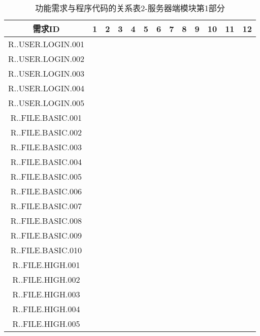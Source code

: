 \begin{table}[htbp]
\centering
\caption{功能需求与程序代码的关系表2-服务器端模块第1部分} \label{tab:requirement-module}
\begin{tabular}{|c|c|c|c|c|c|c|c|c|c|c|c|c|}
    \hline 
    需求ID & 1 & 2 & 3 & 4 & 5 & 6 & 7 & 8 & 9 & 10 & 11 & 12 \\    
    \hline 
    R..USER.LOGIN.001 &&&&&&&&&&&& \\
    \hline
    R..USER.LOGIN.002 &&&&&&&&&&&& \\
    \hline 
    R..USER.LOGIN.003 &&&&&&&&&&&& \\
    \hline
    R..USER.LOGIN.004 &&&&&&&&&&&& \\
    \hline
    R..USER.LOGIN.005 &&&&&&&&&&&& \\
    \hline
    R..FILE.BASIC.001 &&&&&&&&&&&& \\
    \hline
    R..FILE.BASIC.002 &&&&&&&&&&&& \\
    \hline 
    R..FILE.BASIC.003 &&&&&&&&&&&& \\
    \hline
    R..FILE.BASIC.004 &&&&&&&&&&&& \\
    \hline
    R..FILE.BASIC.005 &&&&&&&&&&&& \\
    \hline
    R..FILE.BASIC.006 &&&&&&&&&&&& \\ 
    \hline
    R..FILE.BASIC.007 &&&&&&&&&&&& \\
    \hline
    R..FILE.BASIC.008 &&&&&&&&&&&& \\
    \hline
    R..FILE.BASIC.009 &&&&&&&&&&&& \\ 
    \hline
    R..FILE.BASIC.010 &&&&&&&&&&&& \\ 
    \hline
    R..FILE.HIGH.001 &&&&&&&&&&&& \\
    \hline
    R..FILE.HIGH.002 &&&&&&&&&&&& \\
    \hline
    R..FILE.HIGH.003 &&&&&&&&&&&& \\
    \hline
    R..FILE.HIGH.004 &&&&&&&&&&&& \\
    \hline
    R..FILE.HIGH.005 &&&&&&&&&&&& \\
    \hline
\end{tabular}
\end{table}

